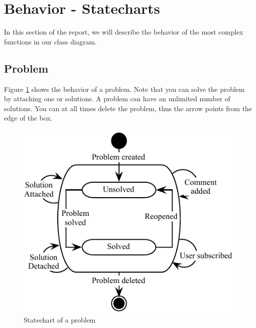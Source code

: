 \section{Behavior - Statecharts}
In this section of the report, we will describe the behavior of the most complex functions in our class diagram.

\subsection{Problem}
Figure \ref{fig:Klasse_diagram_problem} shows the behavior of a problem. Note that you can solve the problem by attaching one or solutions. A problem can have an unlimited number of solutions. You can at all times delete the problem, thus the arrow points from the edge of the box.
\begin{figure}[H]
\begin{center}
\includegraphics[scale=1]{input/problem_domain_analysis/Klassediagram_problem.pdf}
\caption{Statechart of a problem}
\label{fig:Klasse_diagram_problem}
\end{center}
\end{figure}


